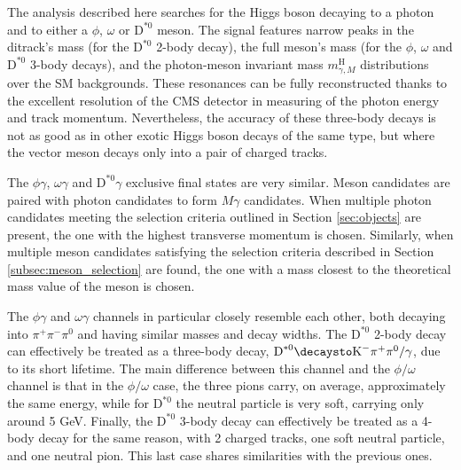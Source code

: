 The analysis described here searches for the Higgs boson decaying to a photon and to either a $\phi$, $\omega$ or $\text{D}^{*0}$ meson. The signal features narrow peaks in the ditrack's mass (for the $\text{D}^{*0}$ 2-body decay), the full meson's mass (for the $\phi$, $\omega$ and $\text{D}^{*0}$ 3-body decays), and the photon-meson invariant mass $m^{\text{H}}_{\gamma, M}$ distributions over the SM backgrounds. These resonances can be fully reconstructed thanks to the excellent resolution of the CMS detector in measuring of the photon energy and track momentum. Nevertheless, the accuracy of these three-body decays is not as good as in other exotic Higgs boson decays of the same type, but where the vector meson decays only into a pair of charged tracks.

The $\phi\gamma$, $\omega\gamma$ and $\text{D}^{*0}\gamma$ exclusive final states are very similar. Meson candidates are paired with photon candidates to form $M\gamma$ candidates. When multiple photon candidates meeting the selection criteria outlined in Section \ref{sec:objects} are present, the one with the highest transverse momentum is chosen. Similarly, when multiple meson candidates satisfying the selection criteria described in Section \ref{subsec:meson_selection} are found, the one with a mass closest to the theoretical mass value of the meson is chosen.

The $\phi\gamma$ and $\omega\gamma$ channels in particular closely resemble each other, both decaying into $\pi^{+}\pi^{-}\pi^0$ and having similar masses and decay widths. The $\text{D}^{*0}$ 2-body decay can effectively be treated as a three-body decay, $\text{D}^{*0}\decaysto \text{K}^{-}\pi^{+}\pi^0/\gamma$, due to its short lifetime. The main difference between this channel and the $\phi/\omega$ channel is that in the $\phi/\omega$ case, the three pions carry, on average, approximately the same energy, while for $\text{D}^{*0}$ the neutral particle is very soft, carrying only around 5 GeV. Finally, the $\text{D}^{*0}$ 3-body decay can effectively be treated as a 4-body decay for the same reason, with 2 charged tracks, one soft neutral particle, and one neutral pion. This last case shares similarities with the previous ones.


